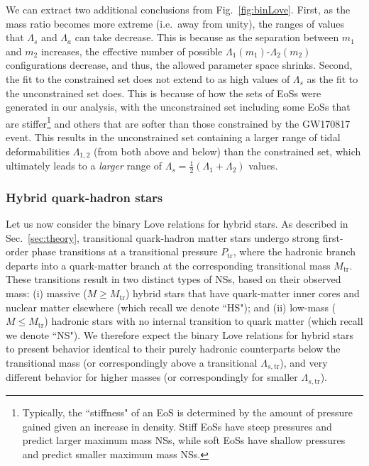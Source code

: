 \documentclass[prd,twocolumn,nofootinbib,superscriptaddress,amsmath,amssymb]{revtex4-1}
\begin{document}
We can extract two additional conclusions from Fig.~\ref{fig:binLove}. First, as the mass ratio becomes more extreme (i.e.~away from unity), the ranges of values that $\Lambda_s$ and $\Lambda_a$ can take decrease. This is because as the separation between $m_1$ and $m_2$ increases, the effective number of possible $\Lambda_1(m_1)$-$\Lambda_2(m_2)$ configurations decrease, and thus, the allowed parameter space shrinks. Second, the fit to the constrained set does not extend to as high values of $\Lambda_s$ as the fit to the unconstrained set does. This is because of how the sets of EoSs were generated in our analysis, with the unconstrained set including some EoSs that are stiffer\footnote{Typically, the ``stiffness" of an EoS is determined by the amount of pressure gained given an increase in density. Stiff EoSs have steep pressures and predict larger maximum mass NSs, while soft EoSs have shallow pressures and predict smaller maximum mass NSs.} and others that are softer than those constrained by the GW170817 event. This results in the unconstrained set  containing a larger range of tidal deformabilities $\Lambda_{1,2}$ (from both above and below) than the constrained set, which ultimately leads to a \emph{larger} range of $\Lambda_s=\frac{1}{2}(\Lambda_1+\Lambda_2)$ values.

\subsubsection{Hybrid quark-hadron stars}

Let us now consider the binary Love relations for hybrid stars. As described in Sec.~\ref{sec:theory}, transitional quark-hadron matter stars undergo strong first-order phase transitions at a transitional pressure $P_{\text{tr}}$, where the hadronic branch departs into a quark-matter branch at the corresponding transitional mass $M_{\text{tr}}$. These transitions result in two distinct types of NSs, based on their observed mass: (i) massive ($M \geq M_{\text{tr}}$) hybrid stars that have quark-matter inner cores and nuclear matter elsewhere (which recall we denote ``HS"); and (ii) low-mass ($M \leq M_{\text{tr}}$) hadronic stars with no internal transition to quark matter (which recall we denote ``NS"). We therefore expect the binary Love relations for hybrid stars to present behavior identical to their purely hadronic counterparts below the transitional mass (or correspondingly above a transitional $\Lambda_{s,\textrm{tr}}$), and very different behavior for higher masses (or correspondingly for smaller $\Lambda_{s,\textrm{tr}}$). 
\end{document}
